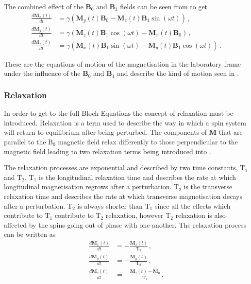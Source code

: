 The combined effect of the $\mathbf{B}_0$ and $\mathbf{B}_1$ fields can be seen from  to get \cite{DeGraaf2007}
\begin{align}
	\frac{d\mathbf{M}_x(t)}{dt} &= \gamma \left(\mathbf{M}_y(t)\mathbf{B}_0 - \mathbf{M}_z(t)\mathbf{B}_1\sin(\omega t)\right)\,,\label{eq:bloch_norelx}\\
	\frac{d\mathbf{M}_y(t)}{dt} &= \gamma \left(\mathbf{M}_z(t)\mathbf{B}_1\cos(\omega t) - \mathbf{M}_x(t)\mathbf{B}_0\right)\,,\label{eq:bloch_norely}\\
	\frac{d\mathbf{M}_z(t)}{dt} &= \gamma \left(\mathbf{M}_x(t)\mathbf{B}_1\sin(\omega t) - \mathbf{M}_y(t)\mathbf{B}_1\cos(\omega t) \right)\,.\label{eq:bloch_norelz}
\end{align}

These are the equations of motion of the magnetisation in the laboratory frame under the influence of the $\mathbf{B}_0$ and $\mathbf{B}_1$ and describe the kind of motion seen in . 

\subsubsection{Relaxation}
In order to get to the full Bloch Equations the concept of relaxation must be introduced. 
Relaxation is a term used to describe the way in which a spin system will return to equilibrium after being perturbed. The components of $\mathbf{M}$ that are parallel to the $\mathrm{B_0}$ magnetic field relax differently to those perpendicular to the magnetic field leading to two relaxation terms being introduced into . 

The relaxation processes are exponential and described by two time constants, $\mathrm{T}_1$ and $\mathrm{T}_2$. $\mathrm{T}_1$ is the longitudinal relaxation time and describes the rate at which longitudinal magnetisation regrows after a perturbation. 
$\mathrm{T}_2$ is the transverse relaxation time and describes the rate at which transverse magnetisation decays after a perturbation. 
$\mathrm{T}_2$ is always shorter than $\mathrm{T}_1$ since all the effects which contribute to $\mathrm{T}_1$ contribute to $\mathrm{T}_2$ relaxation, however $\mathrm{T}_2$ relaxation is also affected by the spins going out of phase with one another.
The relaxation process can be written as \cite{DeGraaf2007}
\begin{align}
	\frac{d\mathbf{M}_x(t)}{dt} &= -\frac{\mathbf{M}_x(t)}{\mathrm{T}_2}\,,\label{eq:bloch_rel1}\\
	\frac{d\mathbf{M}_y(t)}{dt} &= -\frac{\mathbf{M}_y(t)}{\mathrm{T}_2}\,,\label{eq:bloch_rel2}\\
	\frac{d\mathbf{M}_z(t)}{dt} &= -\frac{\mathbf{M}_z(t) - \mathbf{M}_0}{\mathrm{T}_1}\,.\label{eq:bloch_rel3}
\end{align}
		
